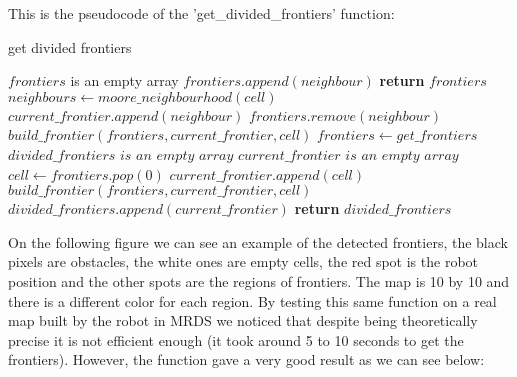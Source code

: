 This is the pseudocode of the 'get\_divided\_frontiers' function:

\FloatBarrier
\begin{algorithm}
    \caption{get divided frontiers}
    \label{get divided frontiers}
    \begin{algorithmic}[1]
            \State $frontiers$ is an empty array
                            \State $frontiers.append(neighbour)$
                        \EndIf
                    \EndFor
                \EndIf
            \EndFor
            \State \textbf{return} $frontiers$
        \EndProcedure
            \State $neighbours \gets moore\_neighbourhood(cell)$
                    \State $current\_frontier.append(neighbour)$
                    \State $frontiers.remove(neighbour)$
                    \State $build\_frontier(frontiers, current\_frontier, cell)$
                \EndIf
            \EndFor
        \EndProcedure
            \State $frontiers \gets get\_frontiers$
            \State $divided\_frontiers$ $is$ $an$ $empty$ $array$
                \State $current\_frontier$ $is$ $an$ $empty$ $array$
                \State $cell \gets frontiers.pop(0)$
                \State $current\_frontier.append(cell)$
                \State $build\_frontier(frontiers, current\_frontier, cell)$
                \State $divided\_frontiers.append(current\_frontier)$
            \EndWhile
            \State \textbf{return} $divided\_frontiers$
        \EndProcedure
    \end{algorithmic}
\end{algorithm}
\FloatBarrier

On the following figure we can see an example of the detected frontiers, the black pixels are obstacles, the white ones are empty cells, the red spot is the robot position and the other spots are the regions of frontiers. 
The map is 10 by 10 and there is a different color for each region.
By testing this same function on a real map built by the robot in MRDS we noticed that despite being theoretically precise it is not efficient enough (it took around 5 to 10 seconds to get the frontiers).
However, the function gave a very good result as we can see below:


